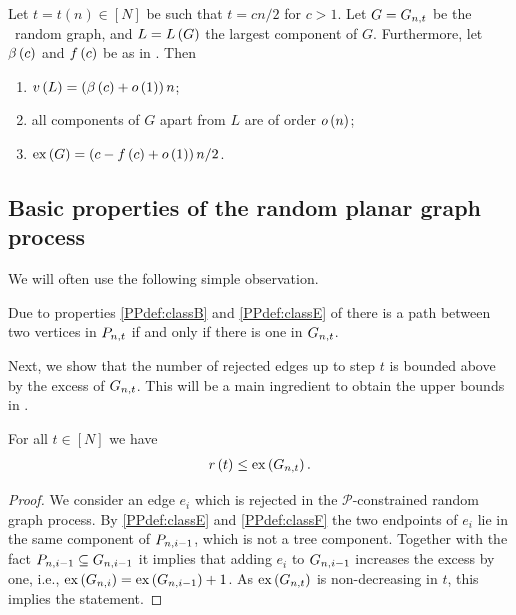 \begin{thm}\label{PPthm:erInt}
	Let $t=t(n)\in\left[N\right]$ be such that $t=cn/2$ for $c>1$. Let $G=G_{n,t}$ be the \ER\ random graph, and $L=L\left(G\right)$ the largest component of $G$. Furthermore, let $\beta\left(c\right)$ and $f\left(c\right)$ be as in . Then \whp
	\begin{enumerate}
		\item\label{PPthm:erIntA}
		$v\left({L}\right)=\left(\beta\left(c\right)+o\left(1\right)\right)n$;
		\item\label{PPthm:erIntC}
		all components of $G$ apart from $L$ are of order $o\left(n\right)$;
		\item\label{PPthm:erIntB}
		$\operatorname{ex}\left(G\right)=\left(c-f\left(c\right)+o\left(1\right)\right)n/2$.
	\end{enumerate}
\end{thm}

\subsection{Basic properties of the random planar graph process}
We will often use the following simple observation.
\begin{remark}\label{PPrem:component_structure}
Due to properties \ref{PPdef:classB} and \ref{PPdef:classE} of  there is a path between two vertices in $P_{n,t}$ if and only if there is one in $G_{n,t}$.
\end{remark}

Next, we show that the number of rejected edges up to step $t$ is bounded above by the excess of $G_{n,t}$. This will be a main ingredient to obtain the upper bounds in .

\begin{lem}\label{PPlem:upperBound_excess}
For all $t\in \left[N\right]$ we have
\begin{align*}
r\left(t\right)\leq \operatorname{ex}\left(G_{n,t}\right).
\end{align*}
\end{lem}

\begin{proof}
We consider an edge $e_i$ which is rejected in the $\mathcal{P}$-constrained random graph process. By \ref{PPdef:classE} and \ref{PPdef:classF} the two endpoints of $e_i$ lie in the same component of $P_{n,i-1}$, which is not a tree component. Together with the fact $P_{n,i-1}\subseteq G_{n,i-1}$ it implies that adding $e_i$ to $G_{n,i-1}$ increases the excess by one, i.e., $\operatorname{ex}\left(G_{n,i}\right)=\operatorname{ex}\left(G_{n,i-1}\right)+1$. As $\operatorname{ex}\left(G_{n,t}\right)$ is non-decreasing in $t$, this implies the statement.
\end{proof}

